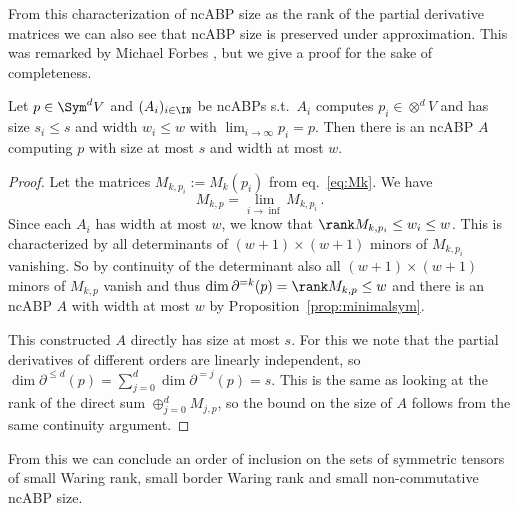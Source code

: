From this characterization of ncABP size as the rank of the partial derivative matrices we can also see that ncABP size is preserved under approximation.
This was remarked by Michael Forbes \cite{forbesWACT16}, but we give a proof for the sake of completeness.
\begin{corollary}
    \label{cor:abpclosure}
    Let $p \in \Sym^d V$ and $(A_i)_{i \in \IN}$ be ncABPs s.t.\ $A_i$ computes $p_i \in \otimes^d V$ and has size $s_i \leq s$ and width $w_i \leq w$ with $\lim_{i \to \infty}p_i = p$.
    Then there is an ncABP $A$ computing $p$ with size at most $s$ and width at most $w$.
\end{corollary}
\begin{proof}
    Let the matrices $M_{k,p_i} := M_k(p_i)$ from eq.~\eqref{eq:Mk}.
%
    We have
    \[
        M_{k,p} = \lim_{i \to \inf} M_{k, p_i}\,.
    \]
    Since each $A_i$ has width at most $w$, we know that $\rank M_{k,p_i} \leq w_i \leq w$.
    This is characterized by all determinants of $(w+1) \times (w+1)$ minors of $M_{k,p_i}$ vanishing.
    So by continuity of the determinant also all $(w+1) \times (w+1)$ minors of $M_{k,p}$ vanish and thus $\dim \partial^{=k}(p) =\rank M_{k,p} \leq w$ and there is an ncABP $A$ with width at most $w$ by Proposition~\ref{prop:minimalsym}.

    This constructed $A$ directly has size at most $s$. For this we note that the partial derivatives of different orders are linearly independent, so $\dim \partial^{\leq d}(p) = \sum_{j=0}^d \dim \partial^{=j}(p) = s$.
    This is the same as looking at the rank of the direct sum $\oplus_{j=0}^d M_{j,p}$, so the bound on the size of $A$ follows from the same continuity argument.
\end{proof}

From this we can conclude an order of inclusion on the sets of symmetric tensors of small Waring rank, small border Waring rank and small non-commutative ncABP size.

